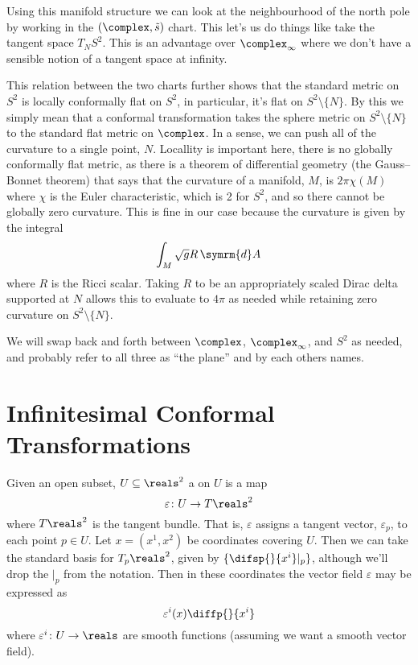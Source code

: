 \documentclass[fleqn]{NotesClass}
\renewcommand{\dd}[1]{\,\symrm{d}#1}
\begin{document}
    Using this manifold structure we can look at the neighbourhood of the north pole by working in the \((\complex, \tilde{s})\) chart.
    This let's us do things like take the tangent space \(T_NS^2\).
    This is an advantage over \(\complex_{\infty}\) where we don't have a sensible notion of a tangent space at infinity.
    
    This relation between the two charts further shows that the standard metric on \(S^2\) is locally conformally flat on \(S^2\), in particular, it's flat on \(S^2 \setminus \{N\}\).
    By this we simply mean that a conformal transformation takes the sphere metric on \(S^2\setminus\{N\}\) to the standard flat metric on \(\complex\).
    In a sense, we can push all of the curvature to a single point, \(N\).
    Locallity is important here, there is no globally conformally flat metric, as there is a theorem of differential geometry (the Gauss--Bonnet theorem) that says that the curvature of a manifold, \(M\), is \(2\pi \chi(M)\) where \(\chi\) is the Euler characteristic, which is 2 for \(S^2\), and so there cannot be globally zero curvature.
    This is fine in our case because the curvature is given by the integral
    \begin{equation}
        \int_M \sqrt{g} R \dd{A}
    \end{equation}
    where \(R\) is the Ricci scalar.
    Taking \(R\) to be an appropriately scaled Dirac delta supported at \(N\) allows this to evaluate to \(4\pi\) as needed while retaining zero curvature on \(S^2\setminus\{N\}\).
    
    We will swap back and forth between \(\complex\), \(\complex_{\infty}\), and \(S^2\) as needed, and probably refer to all three as \enquote{the plane} and by each others names.
    
    \section{Infinitesimal Conformal Transformations}
    Given an open subset, \(U \subseteq \reals^2\) a  on \(U\) is a map
    \begin{equation}
        \varepsilon \colon U \to T\reals^2
    \end{equation}
    where \(T\reals^2\) is the tangent bundle.
    That is, \(\varepsilon\) assigns a tangent vector, \(\varepsilon_p\), to each point \(p \in U\).
    Let \(x = (x^1, x^2)\) be coordinates covering \(U\).
    Then we can take the standard basis for \(T_p\reals^2\), given by \(\{\difsp{}{x^i}|_p\}\), although we'll drop the \(|_p\) from the notation.
    Then in these coordinates the vector field \(\varepsilon\) may be expressed as
    \begin{equation}
        \varepsilon^i(x) \diffp{}{x^i}
    \end{equation}
    where \(\varepsilon^i \colon U \to \reals\) are smooth functions (assuming we want a smooth vector field).
    
\end{document}
